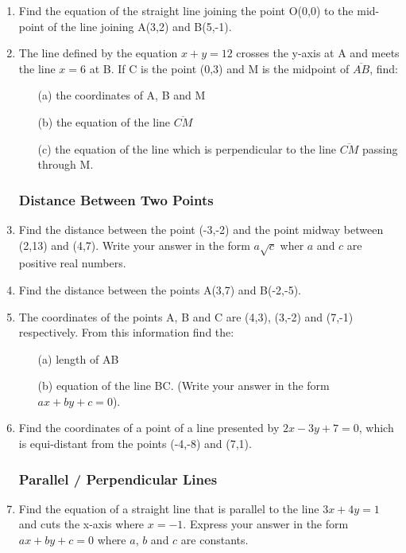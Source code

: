 \begin{enumerate}
	\item Find the equation of the straight line joining the point O(0,0) to the mid-point of the line joining A(3,2) and B(5,-1).
	
	\item The line defined by the equation $x + y = 12$ crosses the y-axis at A and meets the line $x = 6$ at B. If C is the point (0,3) and M is the midpoint of $\overline{AB}$, find:
	\begin{itemize}
	\item[(a)] the coordinates of A, B and M
	\item[(b)] the equation of the line $\overline{CM}$
	\item[(c)] the equation of the line which is perpendicular to the line $\overline{CM}$ passing through M.
	\end{itemize}
	
	
		\subsubsection{Distance Between Two Points}
	\item Find the distance between the point (-3,-2) and the point midway between (2,13) and (4,7). Write your answer in the form $a\sqrt{c}$ wher $a$ and $c$ are positive real numbers.
	
	\item Find the distance between the points A(3,7) and B(-2,-5).
	
	\item The coordinates of the points A, B and C are (4,3), (3,-2) and (7,-1) respectively. From this information find the:
	\begin{itemize}
	\item[(a)] length of AB
	\item[(b)] equation of the line BC. (Write your answer in the form $ax + by + c = 0$).
	\end{itemize}
	
	\item Find the coordinates of a point of a line presented by $2x - 3y + 7 = 0$, which is equi-distant from the points (-4,-8) and (7,1).
	
		\subsubsection{Parallel / Perpendicular Lines}
	\item Find the equation of a straight line that is parallel to the line $3x + 4y = 1$ and cuts the x-axis where $x = -1$. Express your answer in the form $ax + by + c = 0$ where $a$, $b$ and $c$ are constants.
	

\end{enumerate}
